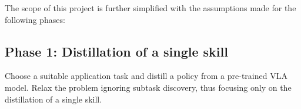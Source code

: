 The scope of this project is further simplified with the assumptions made for the following phases:

\subsection{Phase 1: Distillation of a single skill}

Choose a suitable application task and distill a policy from a pre-trained VLA model. Relax the problem ignoring subtask discovery, thus focusing only on the distillation of a single skill.



